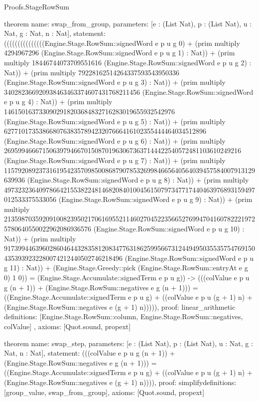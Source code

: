 \begin{lexlean}{Proofs.StageRowSum}
\begin{semanticmodule}
theorem{
  name: swap_from_group,
  parameters: [e : (List Nat), p : (List Nat), u : Nat, g : Nat, n : Nat],
  statement: (((((((((((((((Engine.Stage.RowSum::signedWord e p u g 0) + (prim multiply 4294967296 (Engine.Stage.RowSum::signedWord e p u g 1) : Nat)) + (prim multiply 18446744073709551616 (Engine.Stage.RowSum::signedWord e p u g 2) : Nat)) + (prim multiply 79228162514264337593543950336 (Engine.Stage.RowSum::signedWord e p u g 3) : Nat)) + (prim multiply 340282366920938463463374607431768211456 (Engine.Stage.RowSum::signedWord e p u g 4) : Nat)) + (prim multiply 1461501637330902918203684832716283019655932542976 (Engine.Stage.RowSum::signedWord e p u g 5) : Nat)) + (prim multiply 6277101735386680763835789423207666416102355444464034512896 (Engine.Stage.RowSum::signedWord e p u g 6) : Nat)) + (prim multiply 26959946667150639794667015087019630673637144422540572481103610249216 (Engine.Stage.RowSum::signedWord e p u g 7) : Nat)) + (prim multiply 115792089237316195423570985008687907853269984665640564039457584007913129639936 (Engine.Stage.RowSum::signedWord e p u g 8) : Nat)) + (prim multiply 497323236409786642155382248146820840100456150797347717440463976893159497012533375533056 (Engine.Stage.RowSum::signedWord e p u g 9) : Nat)) + (prim multiply 2135987035920910082395021706169552114602704522356652769947041607822219725780640550022962086936576 (Engine.Stage.RowSum::signedWord e p u g 10) : Nat)) + (prim multiply 9173994463960286046443283581208347763186259956673124494950355357547691504353939232280074212440502746218496 (Engine.Stage.RowSum::signedWord e p u g 11) : Nat)) + (Engine.Stage.Greedy::pick (Engine.Stage.RowSum::entryAt e g 0) 1 0)) = (Engine.Stage.Accumulate::signedTerm e p u g)) -> (((colValue e p u g (n + 1)) + (Engine.Stage.RowSum::negatives e g (n + 1))) = ((Engine.Stage.Accumulate::signedTerm e p u g) + ((colValue e p u (g + 1) n) + (Engine.Stage.RowSum::negatives e (g + 1) n))))),
  proof: linear_arithmetic{
    definitions: [Engine.Stage.RowSum::column, Engine.Stage.RowSum::negatives, colValue]
  },
  axioms: [Quot.sound, propext]
}

theorem{
  name: swap_step,
  parameters: [e : (List Nat), p : (List Nat), u : Nat, g : Nat, n : Nat],
  statement: (((colValue e p u g (n + 1)) + (Engine.Stage.RowSum::negatives e g (n + 1))) = ((Engine.Stage.Accumulate::signedTerm e p u g) + ((colValue e p u (g + 1) n) + (Engine.Stage.RowSum::negatives e (g + 1) n)))),
  proof: simplify{definitions: [group_value, swap_from_group]},
  axioms: [Quot.sound, propext]
}


\end{semanticmodule}
\end{lexlean}
